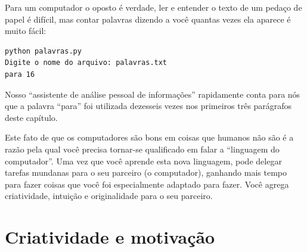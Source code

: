 Para um computador o oposto é verdade, ler e entender o texto
de um pedaço de papel é difícil, mas contar palavras dizendo a 
você quantas vezes ela aparece é muito fácil:

\beforeverb
\begin{verbatim}
python palavras.py
Digite o nome do arquivo: palavras.txt
para 16
\end{verbatim}
\afterverb

Nosso ``assistente de análise pessoal de informações'' rapidamente
conta para nós que a palavra ``para'' foi utilizada dezesseis vezes nos
primeiros três parágrafos deste capítulo.

Este fato de que os computadores são bons em coisas
que humanos não são é a razão pela qual você precisa tornar-se
qualificado em falar a ``linguagem do computador''. Uma vez
que você aprende esta nova linguagem, pode delegar tarefas
mundanas para o seu parceiro (o computador), ganhando mais tempo
para fazer coisas que você foi especialmente adaptado para fazer. Você agrega
criatividade, intuição e originalidade para o seu parceiro. 

\section{Criatividade e motivação}





